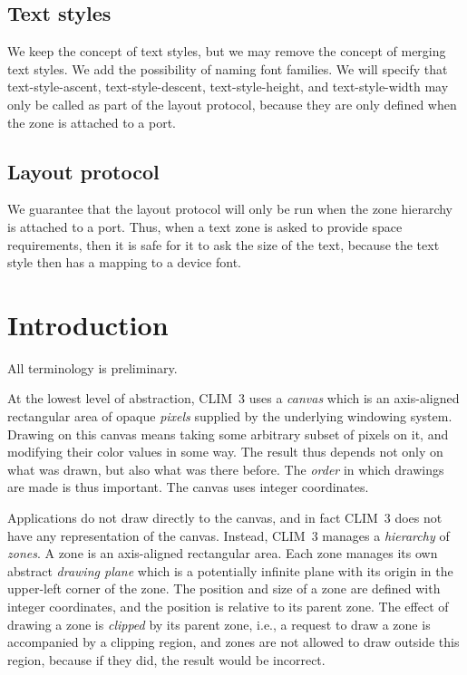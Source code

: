 \documentclass{report}
\def\clim{CLIM~3}
\begin{document}
\section{Text styles}

We keep the concept of text styles, but we may remove the concept of
merging text styles.  We add the possibility of naming font families. 
We will specify that text-style-ascent, text-style-descent,
text-style-height, and text-style-width may only be called as part of
the layout protocol, because they are only defined when the zone is
attached to a port. 

\section{Layout protocol}

We guarantee that the layout protocol will only be run when the zone
hierarchy is attached to a port.  Thus, when a text zone is asked to
provide space requirements, then it is safe for it to ask the size of
the text, because the text style then has a mapping to a device font. 

\chapter{Introduction}

All terminology is preliminary.

At the lowest level of abstraction, \clim{} uses a \emph{canvas} which
is an axis-aligned rectangular area of opaque \emph{pixels} supplied by
the underlying windowing system.  Drawing on this canvas means taking
some arbitrary subset of pixels on it, and modifying their color
values in some way.  The result thus depends not only on what was
drawn, but also what was there before.  The \emph{order} in which
drawings are made is thus important.  The canvas uses integer
coordinates.

Applications do not draw directly to the canvas, and in fact \clim{}
does not have any representation of the canvas.  Instead,
\clim{} manages a \emph{hierarchy} of \emph{zones}.  A zone is an
axis-aligned rectangular area.  Each zone manages its own abstract
\emph{drawing plane} which is a potentially infinite plane with its
origin in the upper-left corner of the zone.  The position and size
of a zone are defined with integer coordinates, and the position is
relative to its parent zone.  The effect of drawing a zone is
\emph{clipped} by its parent zone, i.e., a request to draw a zone
is accompanied by a clipping region, and zones are not allowed to
draw outside this region, because if they did, the result would be
incorrect. 
\end{document}
